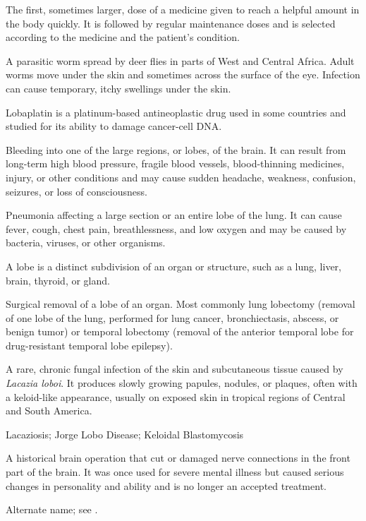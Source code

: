  The first, sometimes larger, dose of a medicine given to reach a helpful amount in the body quickly. It is followed by regular maintenance doses and is selected according to the medicine and the patient's condition.

 A parasitic worm spread by deer flies in parts of West and Central Africa. Adult worms move under the skin and sometimes across the surface of the eye. Infection can cause temporary, itchy swellings under the skin.

 Lobaplatin is a platinum-based antineoplastic drug used in some countries and studied for its ability to damage cancer-cell DNA.

 Bleeding into one of the large regions, or lobes, of the brain. It can result from long-term high blood pressure, fragile blood vessels, blood-thinning medicines, injury, or other conditions and may cause sudden headache, weakness, confusion, seizures, or loss of consciousness.

 Pneumonia affecting a large section or an entire lobe of the lung. It can cause fever, cough, chest pain, breathlessness, and low oxygen and may be caused by bacteria, viruses, or other organisms.

 A lobe is a distinct subdivision of an organ or structure, such as a lung, liver, brain, thyroid, or gland.

 Surgical removal of a lobe of an organ. Most commonly lung lobectomy (removal of one
lobe of the lung, performed for lung cancer, bronchiectasis, abscess, or benign tumor)
or temporal lobectomy (removal of the anterior temporal lobe for drug-resistant temporal
lobe epilepsy).

 A rare, chronic fungal infection of the skin and subcutaneous tissue caused by \textit{Lacazia loboi}. It produces slowly growing papules, nodules, or plaques, often with a keloid-like appearance, usually on exposed skin in tropical regions of Central and South America.

\synonyms
Lacaziosis; Jorge Lobo Disease; Keloidal Blastomycosis

 A historical brain operation that cut or damaged nerve connections in the front part of the brain. It was once used for severe mental illness but caused serious changes in personality and ability and is no longer an accepted treatment.

 Alternate name; see .

